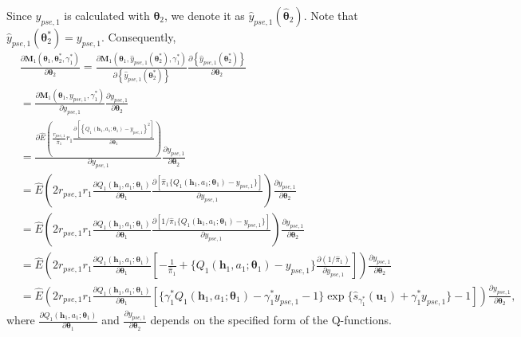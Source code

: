 \documentclass[12pt]{article}
\begin{document}
Since $\widehat{y}_{pse,1}$ is calculated with $\bm{\theta}_2$, we denote it as $\widehat{y}_{pse,1}(\widehat{\bm{\theta}}_2)$. Note that $\widehat{y}_{pse,1}(\bm{\theta}_2^*) = y_{pse,1}$. Consequently,
\begin{align*}
    &\frac{\partial \bm{M}_1(\bm{\theta}_1, \bm{\theta}_2^*,\gamma_1^*)}{\partial \bm{\theta}_2}  = \frac{\partial \bm{M}_1(\bm{\theta}_1, \widehat{y}_{pse,1}(\bm{\theta}_2^*),\gamma_1^*)}{\partial \left\{\widehat{y}_{pse,1}(\bm{\theta}_2^*)\right\}} \frac{\partial \left\{\widehat{y}_{pse,1}(\bm{\theta}_2^*)\right\}}{\partial \bm{\theta}_2}\\
    &= \frac{\partial \bm{M}_1(\bm{\theta}_1, y_{pse,1},\gamma_1^*)}{\partial y_{pse,1}} \frac{\partial y_{pse,1}}{\partial \bm{\theta}_2}\\
    &= \frac{\partial \widehat{E} \left(\frac{r_{pse,1}}{\widehat{\pi}_{1}}r_{1} \frac{\partial \left[ \left\{ Q_1(\bm{h}_1,a_1;\bm{\theta}_1) - y_{pse,1}  \right\}^2\right]}{\partial \bm{\theta}_1} \right)}{\partial y_{pse,1}} \frac{\partial y_{pse,1}}{\partial \bm{\theta}_2}\\
    &= \widehat{E} \left( 2 r_{pse,1} r_1 \frac{\partial Q_1(\bm{h}_1,a_1;\bm{\theta}_1)}{\partial \bm{\theta}_1} \frac{\partial [ \widehat{\pi}_1\{ Q_1(\bm{h}_1,a_1;\bm{\theta}_1) - y_{pse,1}  \}] }{\partial y_{pse,1}} \right) \frac{\partial y_{pse,1}}{\partial \bm{\theta}_2}\\
    &= \widehat{E} \left( 2 r_{pse,1} r_1 \frac{\partial Q_1(\bm{h}_1,a_1;\bm{\theta}_1)}{\partial \bm{\theta}_1} \frac{\partial [ 1/\widehat{\pi}_1\{ Q_1(\bm{h}_1,a_1;\bm{\theta}_1) - y_{pse,1}  \}] }{\partial y_{pse,1}} \right) \frac{\partial y_{pse,1}}{\partial \bm{\theta}_2}\\  
    &= \widehat{E} \left( 2 r_{pse,1} r_1 \frac{\partial Q_1(\bm{h}_1,a_1;\bm{\theta}_1)}{\partial \bm{\theta}_1} \left[ - \frac{1}{\widehat{\pi}_1} + \{ Q_1(\bm{h}_1,a_1;\bm{\theta}_1) - y_{pse,1}\} \frac{\partial ( 1/\widehat{\pi}_1)}{\partial y_{pse,1}} \right]\right) \frac{\partial y_{pse,1}}{\partial \bm{\theta}_2}\\
    &= \widehat{E} \left( 2 r_{pse,1} r_1 \frac{\partial Q_1(\bm{h}_1,a_1;\bm{\theta}_1)}{\partial \bm{\theta}_1} \left[ \{ \gamma_1^* Q_1(\bm{h}_1,a_1;\bm{\theta}_1) - \gamma_1^* y_{pse,1}-1\} \exp\{\widehat{s}_{\gamma_1^*}(\bm{u}_1) + \gamma_1^*y_{pse,1}\} -1 \right]\right) \frac{\partial y_{pse,1}}{\partial \bm{\theta}_2},
\end{align*}
where $\frac{\partial Q_1(\bm{h}_1,a_1;\bm{\theta}_1)}{\partial \bm{\theta}_1}$ and $\frac{\partial y_{pse,1}}{\partial \bm{\theta}_2}$ depends on the specified form of the Q-functions.
\end{document}
